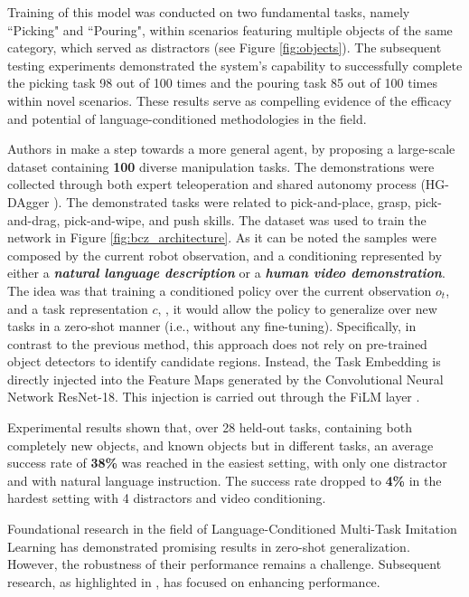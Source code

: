 Training of this model was conducted on two fundamental tasks, namely ``Picking" and ``Pouring", within scenarios featuring multiple objects of the same category, which served as distractors (see Figure \ref{fig:objects}). The subsequent testing experiments demonstrated the system's capability to successfully complete the picking task 98 out of 100 times and the pouring task 85 out of 100 times within novel scenarios. These results serve as compelling evidence of the efficacy and potential of language-conditioned methodologies in the field.


Authors in \cite{jang2022bc_z} make a step towards a more general agent, by proposing a large-scale dataset containing \textbf{100} diverse manipulation tasks. The demonstrations were collected through both expert teleoperation and shared autonomy process (HG-DAgger \cite{kelly2019hg_dagger}). The demonstrated tasks were related to pick-and-place, grasp, pick-and-drag, pick-and-wipe, and push skills. The dataset was used to train the network in Figure \ref{fig:bcz_architecture}. As it can be noted the samples were composed by the current robot observation, and a conditioning represented by either a \textit{\textbf{natural language description}} or a \textit{\textbf{human video demonstration}}.
The idea was that training a conditioned policy over the current observation $o_{t}$, and a task representation $c$, , it would allow the policy to generalize over new tasks in a zero-shot manner (i.e., without any fine-tuning). 
Specifically, in contrast to the previous method, this approach does not rely on pre-trained object detectors to identify candidate regions. Instead, the Task Embedding is directly injected into the Feature Maps generated by the Convolutional Neural Network ResNet-18. This injection is carried out through the FiLM layer \cite{perez2018film}.

Experimental results shown that, over 28 held-out tasks, containing both completely new objects, and known objects but in different tasks, an average success rate of \textbf{38\%} was reached in the easiest setting, with only one distractor and with natural language instruction. The success rate dropped to \textbf{4\%} in the hardest setting with 4 distractors and video conditioning.


Foundational research in the field of Language-Conditioned Multi-Task Imitation Learning has demonstrated promising results in zero-shot generalization. However, the robustness of their performance remains a challenge. Subsequent research, as highlighted in \cite{brohan2022rt,mees2022calvin,mees2022hulc}, has focused on enhancing performance. 


